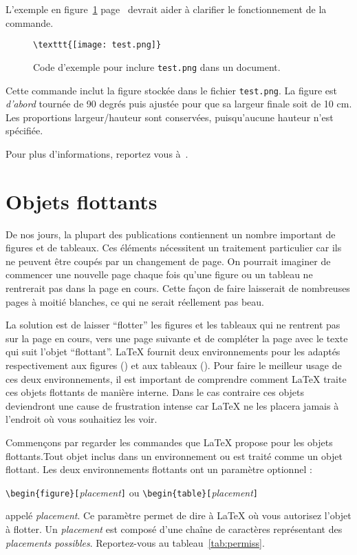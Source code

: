 L'exemple en figure~\ref{figureex} page~\pageref{figureex} devrait
aider à clarifier le fonctionnement de la commande.
\begin{figure}
\begin{lined}{9cm}
\begin{verbatim}
\texttt{[image: test.png]}
\end{verbatim}
\end{lined}
\caption{Code d'exemple pour inclure \texttt{test.png} dans un document.\label{figureex}}
\end{figure}

Cette commande inclut la figure stockée dans le fichier
\texttt{test.png}. La figure est \emph{d'abord} tournée de 90 degrés
puis ajustée pour que sa largeur finale soit de 10 cm. Les proportions
largeur/hauteur sont conservées, puisqu'aucune hauteur n'est spécifiée.

Pour plus d'informations, reportez vous à~\cite{graphics}.

\section{Objets flottants}

De nos jours, la plupart des publications contiennent un nombre
important de figures et de tableaux. Ces éléments nécessitent un
traitement particulier car ils ne peuvent être coupés par un
changement de page. On pourrait imaginer de commencer une nouvelle
page chaque fois qu'une figure ou un tableau ne rentrerait pas dans la
page en cours. Cette façon de faire laisserait de nombreuses pages à moitié
blanches, ce qui ne serait réellement pas beau.

La solution est de laisser \enquote{flotter} les figures et les tableaux
qui ne rentrent pas sur la page en cours, vers une page suivante et de
compléter la page avec le texte qui suit l'objet \enquote{flottant}.
\LaTeX{} fournit deux
environnements pour les  adaptés respectivement
aux figures () et aux tableaux (). Pour
faire le meilleur usage de ces deux environnements, il est important
de comprendre comment \LaTeX{} traite ces objets flottants de manière
interne. Dans le cas contraire ces objets deviendront une cause de
frustration intense
car \LaTeX{} ne les placera jamais à l'endroit où vous souhaitiez les
voir.

\bigskip
Commençons par regarder les commandes que \LaTeX{} propose pour les
objets flottants.Tout objet inclus dans un environnement 
ou  est traité comme un objet flottant. Les deux
environnements flottants ont un paramètre optionnel :
\begin{lscommand}
\verb|\begin{figure}[|\emph{placement}\verb|]| ou
\verb|\begin{table}[|\emph{placement}\verb|]|
\end{lscommand}
\noindent
appelé \emph{placement}. Ce paramètre permet de dire à \LaTeX{} où
vous autorisez l'objet à flotter. Un \emph{placement} est composé
d'une chaîne de caractères représentant des \emph{placements
possibles}. Reportez-vous au tableau~\ref{tab:permiss}.


